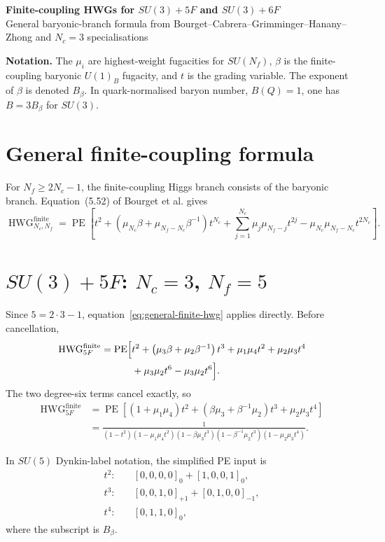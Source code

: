 \documentclass[9pt]{article}
\newcommand{\PE}{\operatorname{PE}}
\newcommand{\HWG}{\operatorname{HWG}}
\begin{document}
\small

\begin{center}
    {\large\bfseries Finite-coupling HWGs for $SU(3)+5F$ and $SU(3)+6F$}\\[-1mm]
    {\footnotesize General baryonic-branch formula from Bourget--Cabrera--Grimminger--Hanany--Zhong and $N_c=3$ specialisations}
\end{center}

\textbf{Notation.}
The $\mu_i$ are highest-weight fugacities for $SU(N_f)$, $\beta$ is the
finite-coupling baryonic $U(1)_B$ fugacity, and $t$ is the grading variable.
The exponent of $\beta$ is denoted $B_\beta$.  In quark-normalised baryon
number, $B(Q)=1$, one has $B=3B_\beta$ for $SU(3)$.

\section*{General finite-coupling formula}
For $N_f\geq 2N_c-1$, the finite-coupling Higgs branch consists of the
baryonic branch.  Equation~(5.52) of Bourget et al. gives
\begin{equation}
\label{eq:general-finite-hwg}
\HWG^{\mathrm{finite}}_{N_c,N_f}
=
\PE\!\left[
 t^2
 +\left(\mu_{N_c}\beta+\mu_{N_f-N_c}\beta^{-1}\right)t^{N_c}
 +\sum_{j=1}^{N_c}\mu_j\mu_{N_f-j}t^{2j}
 -\mu_{N_c}\mu_{N_f-N_c}t^{2N_c}
\right].
\end{equation}

\section*{$SU(3)+5F$: $N_c=3$, $N_f=5$}
Since $5=2\cdot3-1$, equation~\eqref{eq:general-finite-hwg} applies directly.
Before cancellation,
\begin{align}
\HWG^{\mathrm{finite}}_{5F}
=\PE\!\Big[
&t^2
+\left(\mu_3\beta+\mu_2\beta^{-1}\right)t^3
+\mu_1\mu_4t^2
+\mu_2\mu_3t^4 \notag\\
&+\mu_3\mu_2t^6
-\mu_3\mu_2t^6
\Big].
\end{align}
The two degree-six terms cancel exactly, so
\begin{align}
\HWG^{\mathrm{finite}}_{5F}
&=\PE\!\left[
(1+\mu_1\mu_4)t^2
+\left(\beta\mu_3+\beta^{-1}\mu_2\right)t^3
+\mu_2\mu_3t^4
\right] \\
&=\frac{1}
{(1-t^2)(1-\mu_1\mu_4t^2)
 (1-\beta\mu_3t^3)(1-\beta^{-1}\mu_2t^3)
 (1-\mu_2\mu_3t^4)}.
\end{align}

In $SU(5)$ Dynkin-label notation, the simplified PE input is
\begin{align}
 t^2:&\quad [0,0,0,0]_{0}+[1,0,0,1]_{0},\\
 t^3:&\quad [0,0,1,0]_{+1}+[0,1,0,0]_{-1},\\
 t^4:&\quad [0,1,1,0]_{0},
\end{align}
where the subscript is $B_\beta$.
\end{document}
